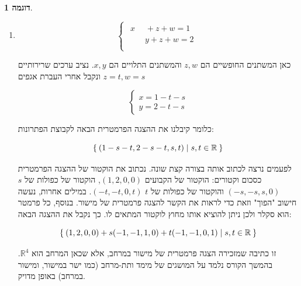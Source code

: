\documentclass[12pt]{report}
\theoremstyle{plain}
\theoremstyle{definition}
\newtheorem{example}{דוגמה}[chapter]
\newcommand{\R}{\mathbb{R}}
\newcommand{\0}{\mathbf{0}}
\begin{document}
\begin{example}
\begin{enumerate}[label=\alph*.]
זו ממ"ל יחסית פשוטה בארבעה משתנים $x,y,z,w$. אפשר
להתייחס ל-$w$ כמשתנה חופשי ואז כל שאר המשתנים תלויים בו. נשתמש
בפרמטר $t$, נציב $w=t$ במשוואות ואז נחסיר $t$ מכל אגף
בכל משוואה. כך נקבל
$$
\begin{cases}
x=1-t\\
y=2-t\\
z=3-t
\end{cases}
$$

לכן קבוצת הפתרונות של הממ"ל היא 
$$
.\Set{(1-t,2-t,3-t,t)|t\in\R}=\Set{(1,2,3,0)+t(-1,-1,-1,1)|t\in\R}
$$

אפשר לנסות לדמיין קבוצה זו כישר במרחב $\R^4$
הארבע-מימדי. זה בהחלט לא משהו שרואים ביום-יום כי העולם המוכר הוא תלת-מימדי,
אבל זו עדיין הצגה אלגברית של ישר חד-מימדי. זה נובע מכך שיש משתנה חופשי יחיד, ומכאן הפרמטר
$t$.
אם לצורך העניין היה פרמטר נוסף בהצגה
הפרמטרית (בקבוצת הפתרונות של ממ"ל אחרת), הקבוצה הייתה "נראית" כמו מישור ב-
$\R^{4}$
ככל שאפשר לדמיין אותו. נראה מקרה כזה בדוגמה הבאה.

\item
$$
\begin{cases}
\begin{aligned}
x\phantom{+y}+z+w=1\\
\phantom{x+}y+z+w=2\\
\end{aligned}
\end{cases}
$$

כאן המשתנים החופשיים הם
$z,w$
והמשתנים התלויים הם
$x,y$.
נציב ערכים שרירותיים
$z=t, w=s$
ונקבל אחרי העברת אגפים

$$
\begin{cases}
x=1-t-s \\
y=2-t-s
\end{cases}
$$
 
כלומר קיבלנו את ההצגה הפרמטרית הבאה לקבוצת הפתרונות:
 
$$
\Set{(1-s-t,2-s-t,s,t)|s,t\in\R}
$$

לפעמים נרצה לכתוב אותה בצורה קצת שונה. נכתוב את הוקטור של ההצגה הפרמטרית כסכום וקטורים: הוקטור של הקבועים
$(1,2,0,0)$,
הוקטור של כפולות של 
$s$
$(-s,-s,s,0)$
והוקטור של כפולות של
$t$
$(-t,-t,0,t)$.
במילים אחרות, נעשה חישוב "הפוך" וזאת כדי לראות את הקשר להצגה פרמטרית של מישור. בנוסף, כל פרמטר הוא סקלר ולכן ניתן להוציא אותו מחוץ לוקטור המתאים לו. כך נקבל את ההצגה הבאה:

$$
\Set{(1,2,0,0)+s(-1,-1,1,0)+t(-1,-1,0,1)|s,t\in\R}
$$

זו כתיבה שמזכירה הצגה פרמטרית של מישור במרחב, אלא שכאן המרחב הוא $\R^{4}$.
בהמשך הקורס נלמד על המושגים של מימד ותת-מרחב (כמו ישר במישור, ומישור
במרחב) באופן מדויק.


\end{enumerate}
\end{example}
\end{document}
